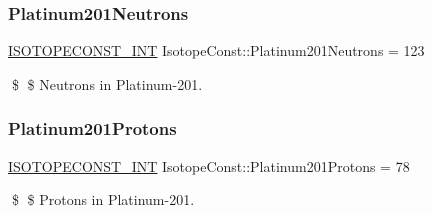 \subsubsection{\texorpdfstring{Platinum201\+Neutrons}{Platinum201Neutrons}}
{\footnotesize\ttfamily \mbox{\hyperlink{group___isotope_const-_macros_ga5f18360b3e99483a35c32d789e62621c}{I\+S\+O\+T\+O\+P\+E\+C\+O\+N\+S\+T\+\_\+\+I\+NT}} Isotope\+Const\+::\+Platinum201\+Neutrons = 123}

\$ \$ Neutrons in Platinum-\/201. \mbox{\label{group___isotope_const-_platinum-_pt201_ga6f267baedd71ef5adff9428fd82899e9}} 
\subsubsection{\texorpdfstring{Platinum201\+Protons}{Platinum201Protons}}
{\footnotesize\ttfamily \mbox{\hyperlink{group___isotope_const-_macros_ga5f18360b3e99483a35c32d789e62621c}{I\+S\+O\+T\+O\+P\+E\+C\+O\+N\+S\+T\+\_\+\+I\+NT}} Isotope\+Const\+::\+Platinum201\+Protons = 78}

\$ \$ Protons in Platinum-\/201. 
